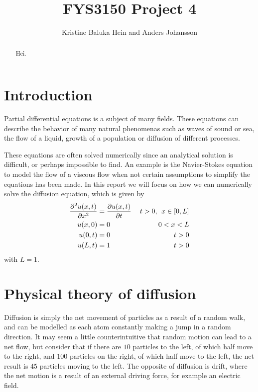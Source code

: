 \documentclass[12pt,english,a4paper]{article}
\title{FYS3150 Project 4}
\author{Kristine Baluka Hein and Anders Johansson}
\begin{document}

\pagestyle{fancy}
\tableofcontents

\begin{abstract}
Hei.
\end{abstract}
\listoftodos
\clearpage

\section{Introduction}
Partial differential equations is a subject of many fields. These equations can describe the behavior of many natural phenomenas such as waves of sound or sea, the flow of a liquid, growth of a population or diffusion of different processes.

These equations are often solved numerically since an analytical solution is difficult, or perhaps impossible to find. An example is the Navier-Stokes equation to model the flow of a viscous flow when not certain assumptions to simplify the equations has been made.
In this report we will focus on how we can numerically solve the diffusion equation, which is given by
\begin{equation}\label{eq:diffusion}
\begin{aligned}
\pdv[2]{u(x,t)}{x} &= \pdv{u(x,t)}{t} &\: t>0, \:\:x\in[0,L] \\
u(x,0) &= 0  &0 < x < L\\
u(0,t) &= 0 &t>0 \\
u(L,t) &= 1&t>0
\end{aligned}
\end{equation}
with \(L = 1\).


\section{Physical theory of diffusion}
Diffusion is simply the net movement of particles as a result of a random walk, and can be modelled as each atom constantly making a jump in a random  direction. It may seem a little counterintuitive that random motion can lead to a net flow, but consider that if there are \(10\) particles to the left, of which half move to the right, and \(100\) particles on the right, of which half move to the left, the net result is \(45\) particles moving to the left. The opposite of diffusion is drift, where the net motion is a result of an external driving force, for example an electric field.
\end{document}
